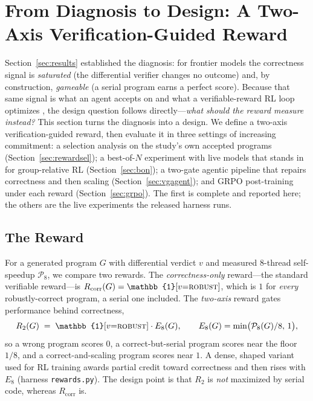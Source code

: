 \section{From Diagnosis to Design: A Two-Axis Verification-Guided Reward}
\label{sec:reward}

Section~\ref{sec:results} established the diagnosis: for frontier models the correctness
signal is \emph{saturated} (the differential verifier changes no outcome) and, by
construction, \emph{gameable} (a serial program earns a perfect score). Because that
same signal is what an agent accepts on and what a verifiable-reward RL loop optimizes
\cite{rlvr,grpo}, the design question follows directly---\emph{what should the reward
measure instead?} This section turns the diagnosis into a design. We define a two-axis
verification-guided reward, then evaluate it in three settings of increasing commitment:
a selection analysis on the study's own accepted programs (Section~\ref{sec:rewardsel});
a best-of-$N$ experiment with live models that stands in for group-relative RL
(Section~\ref{sec:bon}); a two-gate agentic pipeline that repairs correctness and then
scaling (Section~\ref{sec:vgagent}); and GRPO post-training under each reward
(Section~\ref{sec:grpo}). The first is complete and reported here; the others are the
live experiments the released harness runs.

\subsection{The Reward}
\label{sec:rewarddef}
For a generated program $G$ with differential verdict $v$ and measured 8-thread
self-speedup $\mathcal{P}_8$, we compare two rewards. The \emph{correctness-only}
reward---the standard verifiable reward---is
$R_{\text{corr}}(G)=\mathbb{1}[v{=}\textsc{robust}]$, which is $1$ for \emph{every}
robustly-correct program, a serial one included. The \emph{two-axis} reward gates
performance behind correctness,
\begin{equation}\label{eq:twoaxis}
R_{2}(G) \;=\; \mathbb{1}[v{=}\textsc{robust}]\cdot E_8(G),\qquad
E_8(G)=\min\!\big(\mathcal{P}_8(G)/8,\,1\big),
\end{equation}
so a wrong program scores $0$, a correct-but-serial program scores near the floor
$1/8$, and a correct-and-scaling program scores near $1$. A dense, shaped variant used
for RL training awards partial credit toward correctness and then rises with $E_8$
(harness \texttt{rewards.py}). The design point is that $R_2$ is \emph{not} maximized by
serial code, whereas $R_{\text{corr}}$ is.


